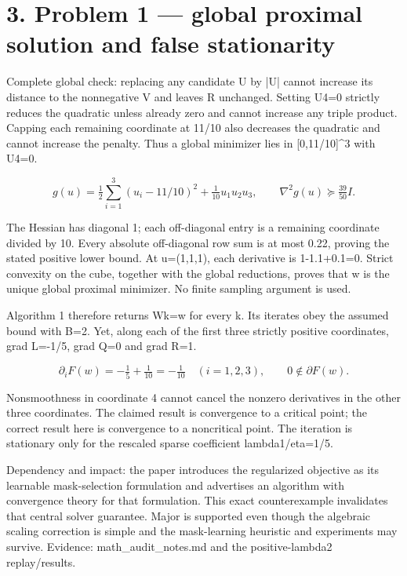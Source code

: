 \documentclass[10pt]{article}
\begin{document}
\section*{3. Problem 1 — global proximal solution and false stationarity}
Complete global check: replacing any candidate U by |U| cannot increase its distance to the nonnegative V and leaves R unchanged. Setting U4=0 strictly reduces the quadratic unless already zero and cannot increase any triple product. Capping each remaining coordinate at 11/10 also decreases the quadratic and cannot increase the penalty. Thus a global minimizer lies in [0,11/10]\textasciicircum{}3 with U4=0.\par
\[g(u)=\tfrac12\sum_{i=1}^{3}(u_i-11/10)^2+\tfrac1{10}u_1u_2u_3,\qquad \nabla^2g(u)\succeq\tfrac{39}{50}I.\]\par
The Hessian has diagonal 1; each off-diagonal entry is a remaining coordinate divided by 10. Every absolute off-diagonal row sum is at most 0.22, proving the stated positive lower bound. At u=(1,1,1), each derivative is 1-1.1+0.1=0. Strict convexity on the cube, together with the global reductions, proves that w is the unique global proximal minimizer. No finite sampling argument is used.\par
Algorithm 1 therefore returns Wk=w for every k. Its iterates obey the assumed bound with B=2. Yet, along each of the first three strictly positive coordinates, grad L=-1/5, grad Q=0 and grad R=1.\par
\[\partial_iF(w)=-\tfrac15+\tfrac1{10}=-\tfrac1{10}\quad(i=1,2,3),\qquad 0\notin\partial F(w).\]\par
Nonsmoothness in coordinate 4 cannot cancel the nonzero derivatives in the other three coordinates. The claimed result is convergence to a critical point; the correct result here is convergence to a noncritical point. The iteration is stationary only for the rescaled sparse coefficient lambda1/eta=1/5.\par
Dependency and impact: the paper introduces the regularized objective as its learnable mask-selection formulation and advertises an algorithm with convergence theory for that formulation. This exact counterexample invalidates that central solver guarantee. Major is supported even though the algebraic scaling correction is simple and the mask-learning heuristic and experiments may survive. Evidence: math\_audit\_notes.md and the positive-lambda2 replay/results.\par
\end{document}
